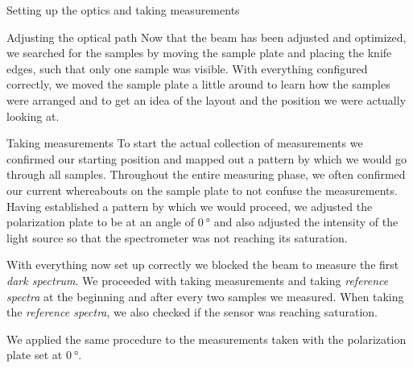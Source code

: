 \documentclass[pdftex, a4paper,11pt, twoside, UKenglish]{report}
\begin{document}
\begin{chapter}{Setting up the optics and taking measurements}
\begin{section}{Adjusting the optical path}
      Now that the beam has been adjusted and optimized, we searched for the
      samples by moving the sample plate and placing the knife edges, such that
      only one sample was visible.
      With everything configured correctly, we moved the sample plate a little
      around to learn how the samples were arranged and to get an idea of the
      layout and the position we were actually looking at.
      
    \end{section}
    
    
    
    \begin{section}{Taking measurements}
      \label{chp:SetupMeasuring}
      To start the actual collection of measurements we confirmed our starting
      position and mapped out a pattern by which we would go through all
      samples. Throughout the entire measuring phase, we often confirmed our
      current whereabouts on the sample plate to not confuse the measurements.
      Having established a pattern by which we would proceed, we adjusted the
      polarization plate to be at an angle of $\SI{0}{\degree}$ and also
      adjusted the intensity of the light source so that the spectrometer was
      not reaching its saturation.
      
      With everything now set up correctly we blocked the beam to measure the
      first \textit{dark spectrum}. We proceeded with taking measurements and
      taking \textit{reference spectra} at the beginning and after every two
      samples we measured. When taking the \textit{reference spectra}, we also
      checked if the sensor was reaching saturation. 
      
      We applied the same procedure to the measurements taken with the
      polarization plate set at $\SI{0}{\degree}$.
      

\end{section}
\end{chapter}
\end{document}
